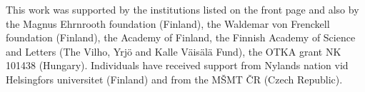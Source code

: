 This work was supported by the institutions listed on the front page and also by the 
Magnus Ehrnrooth foundation (Finland), the Waldemar von Frenckell foundation (Finland), 
the Academy of Finland, the Finnish Academy of Science and Letters (The Vilho, Yrj\"o and Kalle V\"ais\"al\"a Fund), 
the OTKA grant NK 101438 (Hungary). Individuals have received support from Nylands nation vid Helsingfors universitet (Finland) 
and from the M\v SMT \v CR (Czech Republic).
